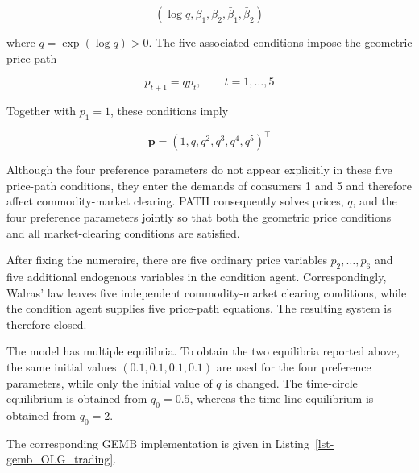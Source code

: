 \documentclass[
  letterpaper,
  DIV=11,
  numbers=noendperiod]{scrreprt}
\begin{document}
\[
(\log q,\beta_1,\beta_2,\bar\beta_1,\bar\beta_2)
\]

where \(q=\exp(\log q)>0\). The five associated conditions impose the
geometric price path

\[
p_{t+1}=qp_t,\qquad t=1,\ldots,5
\]

Together with \(p_1=1\), these conditions imply

\[
\mathbf p=(1,q,q^2,q^3,q^4,q^5)^\top
\]

Although the four preference parameters do not appear explicitly in
these five price-path conditions, they enter the demands of consumers 1
and 5 and therefore affect commodity-market clearing. PATH consequently
solves prices, \(q\), and the four preference parameters jointly so that
both the geometric price conditions and all market-clearing conditions
are satisfied.

After fixing the numeraire, there are five ordinary price variables
\(p_2,\ldots,p_6\) and five additional endogenous variables in the
condition agent. Correspondingly, Walras' law leaves five independent
commodity-market clearing conditions, while the condition agent supplies
five price-path equations. The resulting system is therefore closed.

The model has multiple equilibria. To obtain the two equilibria reported
above, the same initial values \((0.1,0.1,0.1,0.1)\) are used for the
four preference parameters, while only the initial value of \(q\) is
changed. The time-circle equilibrium is obtained from \(q_0=0.5\),
whereas the time-line equilibrium is obtained from \(q_0=2\).

The corresponding GEMB implementation is given in
Listing~\ref{lst-gemb_OLG_trading}.
\end{document}
